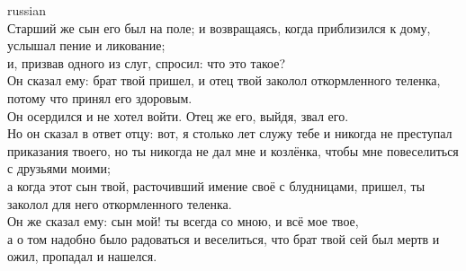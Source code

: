 \documentclass[10pt]{article} %
\begin{document}
{\begin{minipage}[t]{0.48\textwidth}
\begin{otherlanguage*}{russian}
\\
Старший же сын его был на поле; и возвращаясь, когда приблизился к дому, услышал пение и ликование;
\\
и, призвав одного из слуг, спросил: что это такое?
\\
Он сказал ему: брат твой пришел, и отец твой заколол откормленного теленка, потому что принял его здоровым.
\\
Он осердился и не хотел войти. Отец же его, выйдя, звал его.
\\
Но он сказал в ответ отцу: вот, я столько лет служу тебе и никогда не преступал приказания твоего, но ты никогда не дал мне и козлёнка, чтобы мне повеселиться с друзьями моими;
\\
а когда этот сын твой, расточивший имение своё с блудницами, пришел, ты заколол для него откормленного теленка.
\\
Он же сказал ему: сын мой! ты всегда со мною, и всё мое твое,
\\
а о том надобно было радоваться и веселиться, что брат твой сей был мертв и ожил, пропадал и нашелся.
\end{otherlanguage*}
\end{minipage}
\hfill
\begin{minipage}[t]{0.45\textwidth}


\end{minipage}}
\end{document}

